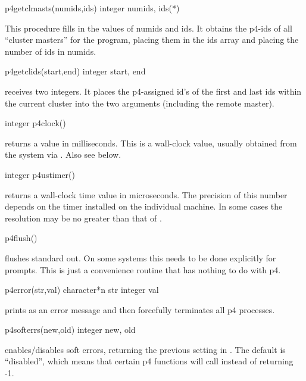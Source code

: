 \begin{example}
p4getclmasts(numids,ids)
integer numids, ids(*)
\end{example}
\noindent
This procedure fills in the values of numids and ids.  It obtains the
p4-ids of all ``cluster masters'' for the program, placing them in the
ids array and placing the number of ids in numids.

\begin{example}
p4getclids(start,end)
integer start, end
\end{example}
\noindent
receives two integers.  It places the p4-assigned id's of
the first and last ids within the current cluster into the two
arguments (including the remote master).

\begin{example}
integer p4clock()
\end{example}
\noindent
returns a value in milliseconds.  This is a wall-clock value, usually obtained
from the system via .  Also see  below.

\begin{example}
integer p4ustimer()
\end{example}
\noindent
returns a wall-clock time value in microseconds.  The precision of this
number depends on the timer installed on the individual machine.  In
some cases the resolution may be no greater than that of .

\begin{example}
p4flush()
\end{example}
\noindent
flushes standard out.  On some systems this needs to be done explicitly for
prompts.  This is just a convenience routine that has nothing to do with p4.

\begin{example}
p4error(str,val)
character*n str
integer val
\end{example}
\noindent
prints  as an error message and then forcefully terminates
all p4 processes.

\begin{example}
p4softerrs(new,old)
integer new, old
\end{example}
\noindent
enables/disables soft errors, returning the previous setting in
.  The default is ``disabled'', which means that certain p4
functions will call  instead of returning -1.


